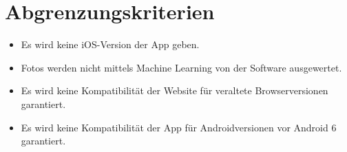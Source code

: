 \section{Abgrenzungskriterien}
\begin{itemize}
	\item Es wird keine iOS-Version der App geben.
	\item Fotos werden nicht mittels Machine Learning von der Software ausgewertet.
	\item Es wird keine Kompatibilität der Website für veraltete Browserversionen garantiert.
	\item Es wird keine Kompatibilität der App für Androidversionen vor Android 6 garantiert.
\end{itemize}
